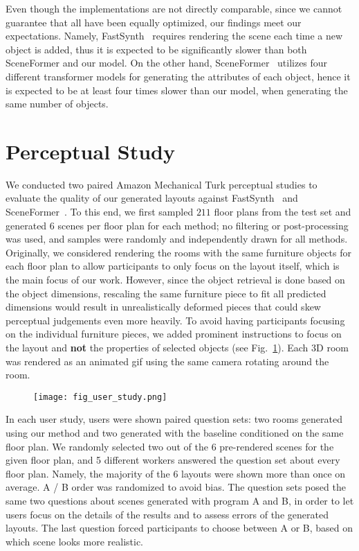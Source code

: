 \documentclass{article}
\newcommand{\figref}[1]{Fig.~\ref{#1}}
\begin{document}
Even though the implementations are not directly comparable, since we cannot
guarantee that all have been equally optimized, our findings meet our
expectations. Namely, FastSynth~\cite{Ritchie2019CVPR} requires rendering the
scene each time a new object is added, thus it is expected to be significantly
slower than both SceneFormer and our model. On the other hand,
SceneFormer~\cite{Wang2020ARXIV} utilizes four different transformer models for
generating the attributes of each object, hence it is expected to be at least
four times slower than our model, when generating the same number of objects.

\section{Perceptual Study}

We conducted two paired Amazon Mechanical Turk perceptual studies to evaluate
the quality of our generated layouts against FastSynth~\cite{Ritchie2019CVPR} and
SceneFormer~\cite{Wang2020ARXIV}. To this end, we first sampled $211$ floor
plans from the test set and generated $6$ scenes per
floor plan for each method; no filtering or post-processing was used, and samples were randomly
and independently drawn for all methods. Originally, we considered rendering
the rooms with the same furniture objects for each floor plan to allow
participants to only focus on the layout itself, which is the main focus of our
work. However, since the object retrieval is done based on the object
dimensions, rescaling the same furniture piece to fit all predicted dimensions
would result in unrealistically deformed pieces that could skew perceptual
judgements even more heavily.
To avoid having participants focusing on the individual furniture pieces, we
added prominent instructions to focus on the layout and \textbf{not} the
properties of selected objects (see \figref{fig:ustudy_ui}). Each 3D room was
rendered as an animated gif using the same camera rotating around the room. 

\begin{figure}[h!]
\centering
  \texttt{[image: fig\_user\_study.png]}
  \vspace{-1.2em}
  \label{fig:ustudy_ui}
\end{figure}

In each user study, users were shown paired question sets: two rooms generated
using our method and two generated with the baseline conditioned on the same
floor plan. We randomly selected two out of the 6 pre-rendered scenes for the
given floor plan, and 5 different workers answered the question set about every
floor plan. Namely, the majority of the 6 layouts were shown more than once on
average. A / B order was randomized to avoid bias. The question sets posed the
same two questions about scenes generated with program A and B, in order to let users focus on
the details of the results and to assess errors of the generated layouts.  The
last question forced participants to choose between A or B, based on which
scene looks more realistic.
\end{document}
